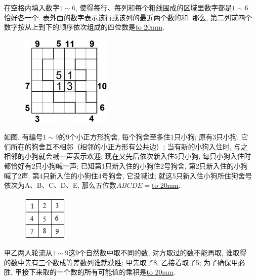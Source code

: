 \item {
    在空格内填入数字$1\sim 6$, 使得每行、每列和每个粗线围成的区域里数字都是$1\sim 6$恰好各一个. 表外面的数字表示该行或该列的最近两个数的和. 那么, 第二列前四个数字按从上到下的顺序依次组成的四位数是\underline{\hbox to 20mm{}}.
    \begin{figure}[H] 
        \centering
        \includegraphics[width=0.4\textwidth]{./pics/Chapter_5/2016_1.png}
    \end{figure}
    \vspace{1cm}
}

\item {
    如图, 有编号$1\sim 9$的9个小正方形狗舍, 每个狗舍至多住1只小狗; 原有3只小狗, 它们所在的狗舍互不相邻（相邻的小正方形有公共边）; 当有新的小狗入住时, 与之相邻的小狗就会喊一声表示欢迎; 现在又先后依次新入住5只小狗, 每只小狗入住时都恰好有2只小狗喊一声; 已知第1只新入住的小狗住2号狗舍, 第2只新入住的小狗喊了2声. 第4只新入住的小狗住4号狗舍, 它没喊过; 就这5只新入住小狗所住狗舍号依次为A、B、C、D、E, 那么五位数$ABCDE=$\underline{\hbox to 20mm{}}.
    \begin{figure}[H] 
        \centering
        \includegraphics[width=0.2\textwidth]{./pics/Chapter_5/2016_2.png}
    \end{figure}
    \vspace{1cm}
}

\item {
    甲乙两人轮流从$1\sim 9$这9个自然数中取不同的数, 对方取过的数不能再取, 谁取得的数中先有三个数成等差数列谁就获胜; 甲先取了8, 乙接着取了5; 为了确保甲必胜, 甲接下来取的一个数的所有可能值的乘积是\underline{\hbox to 20mm{}}.
    \vspace{1cm}
}

